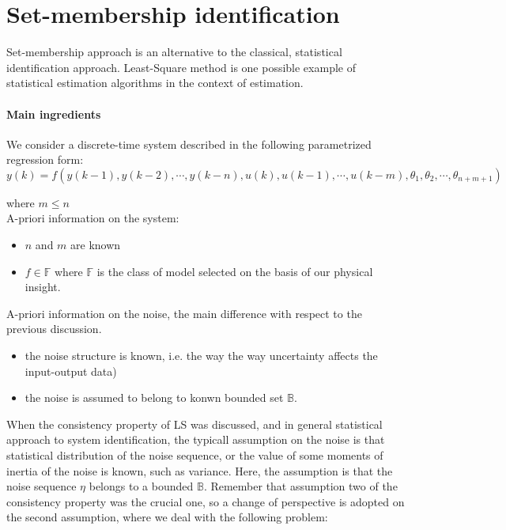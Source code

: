 \chapter{Set-membership identification}    %

Set-membership approach is an alternative to the classical, statistical identification approach. Least-Square method is one possible example of statistical estimation algorithms in the context of estimation.\\

\subsubsection{Main ingredients}

We consider a discrete-time system described in the following parametrized regression form:\\
\begin{equation}
y(k) = f(y(k-1), y(k-2), \cdots, y(k-n), u(k), u(k-1), \cdots, u(k-m), \theta_1, \theta_2, \cdots, \theta_{n+m+1})
\end{equation}

where \(m\leq n\)\\
A-priori information on the system:
\begin{itemize}
    \item \(n\) and \(m\) are known
    \item \(f \in \mathbb{F}\) where \(\mathbb{F}\) is the class of model selected on the basis of our physical insight. 
\end{itemize}


A-priori information on the noise, the main difference with respect to the previous discussion.
\begin{itemize}
    \item the noise structure is known, i.e. the way the way uncertainty affects the input-output data)
    \item the noise is assumed to belong to konwn bounded set \(\mathbb{B}\).
\end{itemize}

When the consistency property of LS was discussed, and in general statistical approach to system identification, the typicall assumption on the noise is that statistical distribution of the noise sequence, or the value of some moments of inertia of the noise is known, such as variance. Here, the assumption is that the noise sequence \(\eta\) belongs to a bounded \(\mathbb{B}\). Remember that assumption two of the consistency property was the crucial one, so a change of perspective is adopted on the second assumption, where we deal with the following problem:

